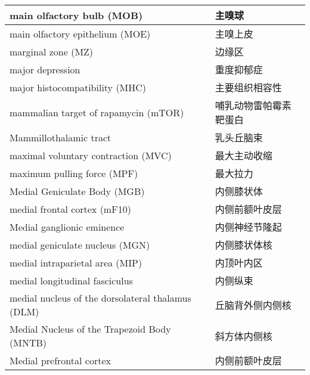 \begin{longtable}{lll}
	\midrule
	main olfactory bulb (MOB) && 主嗅球  \\
	
	\midrule
	main olfactory epithelium (MOE)  && 主嗅上皮  \\
	
	\midrule
	marginal zone (MZ)   && 边缘区  \\
	
	\midrule
	major depression   && 重度抑郁症  \\
	
	\midrule
	major histocompatibility (MHC)   && 主要组织相容性  \\
	
	\midrule
	mammalian target of rapamycin (mTOR)   && 哺乳动物雷帕霉素靶蛋白  \\
	
	\midrule
	Mammillothalamic tract   && 乳头丘脑束  \\
	
	\midrule
	maximal voluntary contraction (MVC)   && 最大主动收缩  \\
	
	\midrule
	maximum pulling force (MPF)   && 最大拉力  \\
	
	\midrule
	Medial Geniculate Body (MGB)   && 内侧膝状体  \\
	
	\midrule
	medial frontal cortex (mF10)   && 内侧前额叶皮层  \\
	
	\midrule
	Medial ganglionic eminence   && 内侧神经节隆起  \\
	
	\midrule
	medial geniculate nucleus (MGN)  && 内侧膝状体核  \\
	
	\midrule
	medial intraparietal area (MIP)   && 内顶叶内区  \\
	
	\midrule
	medial longitudinal fasciculus   && 内侧纵束  \\
	
	\midrule
	medial nucleus of the dorsolateral thalamus (DLM)  && 丘脑背外侧内侧核  \\
	
	\midrule
	Medial Nucleus of the Trapezoid Body (MNTB)   && 斜方体内侧核  \\
	
	\midrule
	Medial prefrontal cortex    && 内侧前额叶皮层  \\
	

\end{longtable}
